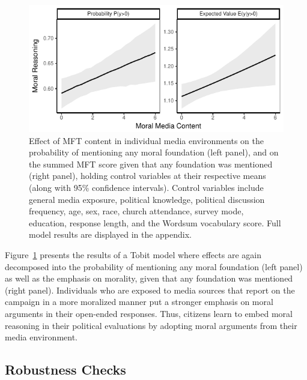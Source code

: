 \documentclass[12pt]{article}
\begin{document}
\begin{figure}[h]\centering
\includegraphics{../calc/fig/tobit_media.pdf}
\caption{Effect of MFT content in individual media environments on the probability of mentioning any moral foundation (left panel), and on the summed MFT score given that any foundation was mentioned (right panel), holding control variables at their respective means (along with 95\% confidence intervals). Control variables include general media exposure, political knowledge, political discussion frequency, age, sex, race, church attendance, survey mode, education, response length, and the Wordsum vocabulary score. Full model results are displayed in the appendix.
}\label{fig:tobit_media}
\end{figure}

Figure~\ref{fig:tobit_media} presents the results of a Tobit model where effects are again decomposed into the probability of mentioning any moral foundation (left panel) as well as the emphasis on morality, given that any foundation was mentioned (right panel). Individuals who are exposed to media sources that report on the campaign in a more moralized manner put a stronger emphasis on moral arguments in their open-ended responses. Thus, citizens learn to embed moral reasoning in their political evaluations by adopting moral arguments from their media environment.



\subsection*{Robustness Checks}
\end{document}
